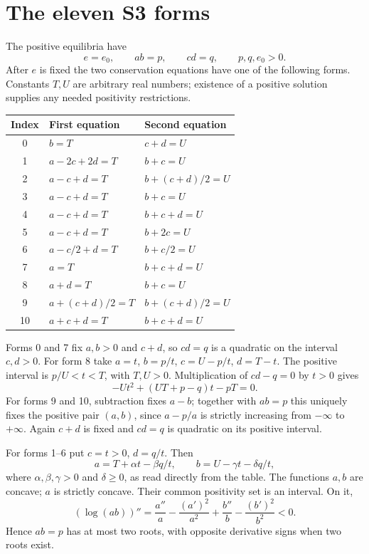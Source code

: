 \documentclass[11pt,a4paper]{report}
\begin{document}
\section{The eleven S3 forms}
The positive equilibria have
\[
 e=e_0,\qquad ab=p,\qquad cd=q,\qquad p,q,e_0>0.
\]
After $e$ is fixed the two conservation equations have one of the following forms. Constants $T,U$
are arbitrary real numbers; existence of a positive solution supplies any needed positivity restrictions.
\begin{center}\small
\begin{tabular}{cll}
\toprule
Index & First equation & Second equation\\
\midrule
0 &$b=T$ &$c+d=U$\\
1 &$a-2c+2d=T$ &$b+c=U$\\
2 &$a-c+d=T$ &$b+(c+d)/2=U$\\
3 &$a-c+d=T$ &$b+c=U$\\
4 &$a-c+d=T$ &$b+c+d=U$\\
5 &$a-c+d=T$ &$b+2c=U$\\
6 &$a-c/2+d=T$ &$b+c/2=U$\\
7 &$a=T$ &$b+c+d=U$\\
8 &$a+d=T$ &$b+c=U$\\
9 &$a+(c+d)/2=T$ &$b+(c+d)/2=U$\\
10 &$a+c+d=T$ &$b+c+d=U$\\
\bottomrule
\end{tabular}
\end{center}
Forms 0 and 7 fix $a,b>0$ and $c+d$, so $cd=q$ is a quadratic on the interval $c,d>0$.
For form 8 take $a=t$, $b=p/t$, $c=U-p/t$, $d=T-t$. The positive interval is
$p/U<t<T$, with $T,U>0$. Multiplication of $cd-q=0$ by $t>0$ gives
\[
 -Ut^2+(UT+p-q)t-pT=0.
\]
For forms 9 and 10, subtraction fixes $a-b$; together with $ab=p$ this uniquely fixes the positive
pair $(a,b)$, since $a-p/a$ is strictly increasing from $-\infty$ to $+\infty$.
Again $c+d$ is fixed and $cd=q$ is quadratic on its positive interval.

For forms 1--6 put $c=t>0$, $d=q/t$. Then
\[
 a=T+\alpha t-\beta q/t,\qquad
 b=U-\gamma t-\delta q/t,
\]
where $\alpha,\beta,\gamma>0$ and $\delta\ge0$, as read directly from the table.
The functions $a,b$ are concave; $a$ is strictly concave. Their common positivity set is an interval.
On it,
\[
 (\log(ab))''=
 \frac{a''}{a}-\frac{(a')^2}{a^2}
 +\frac{b''}{b}-\frac{(b')^2}{b^2}<0.
\]
Hence $ab=p$ has at most two roots, with opposite derivative signs when two roots exist.
\end{document}
